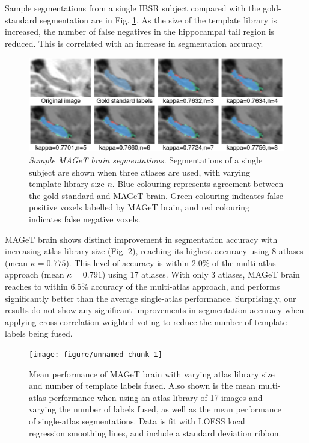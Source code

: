 \documentclass{article}\usepackage{graphicx, color}
\newenvironment{knitrout}{}{} %
\begin{document}
Sample segmentations from a single IBSR subject compared with the gold-standard
segmentation are in Fig.  \ref{montage}.  As the size of the template library
is increased, the number of false negatives in the hippocampal tail region is
reduced.  This is correlated with an increase in segmentation accuracy.

\begin{figure}[h]
\begin{minipage}[b]{1.0\linewidth}
  \centering
  \includegraphics[width=\textwidth]{montage.png}
\end{minipage}
\caption{{\em Sample MAGeT brain segmentations.} 
Segmentations of a single subject are shown when three atlases are used, with
varying template library size $n$. Blue colouring represents agreement between
the gold-standard and MAGeT brain. Green colouring indicates false positive
voxels labelled by MAGeT brain, and red colouring indicates false negative
voxels.
} 
\label{montage}
\end{figure}

MAGeT brain shows distinct improvement in segmentation accuracy with increasing
atlas library size (Fig. \ref{results}), reaching its highest accuracy using 8
atlases (mean $\kappa = 0.775$).  This level of accuracy is within 2.0\% of the
multi-atlas approach (mean $\kappa = 0.791$) using 17 atlases. With only 3
atlases, MAGeT brain reaches to within 6.5\% accuracy of the multi-atlas
approach, and performs significantly better than the average single-atlas
performance. Surprisingly, our results do not show any significant improvements
in segmentation accuracy when applying cross-correlation weighted voting to
reduce the number of template labels being fused.

\begin{figure}
\begin{minipage}[b]{1.0\linewidth}
  \centering
\begin{knitrout}
\color{fgcolor}\texttt{[image: figure/unnamed-chunk-1]} 
\end{knitrout}

\end{minipage}
\caption{
Mean performance of MAGeT brain with varying atlas library size and number of
template labels fused. Also shown is the mean multi-atlas performance when
using an atlas library of 17 images and varying the number of labels fused, as
well as the mean performance of single-atlas segmentations.  Data is fit with
LOESS local regression smoothing lines, and include a standard deviation
ribbon.
}
\label{results}
\end{figure}
\end{document}
